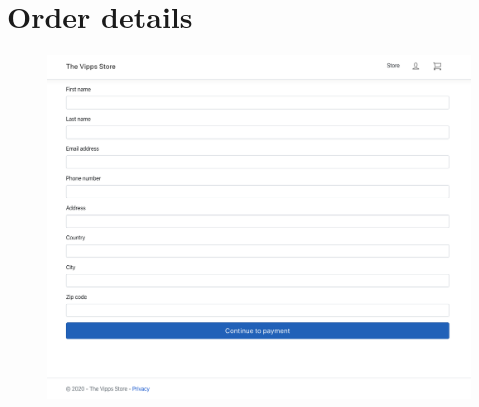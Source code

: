 \documentclass[11pt,a4paper,english]{article}
\begin{document}
\section*{Order details}
\begin{figure}[htbp]
  \centering
  \includegraphics[scale=0.3]{order}
  \caption{}
  \label{fig:order}
\end{figure}
\end{document}
